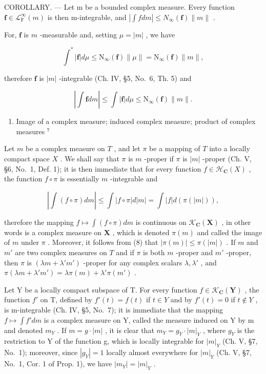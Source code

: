 COROLLARY. --- Let m be a bounded complex measure. Every function \(\mathbf{f} \in \mathcal{L}_{\mathrm{F}}^{\infty}(m)\) is then m-integrable, and \(\left|\int f dm\right| \leqslant N_{\infty}(\mathbf{f}) \|m\|\) .

For, \(\mathbf{f}\) is \(m\) -measurable and, setting \(\mu = |m|\) , we have

\[
\int^ {*} | \mathbf {f} | d \mu \leqslant \mathrm{N} _ {\infty} (\mathbf {f}) \| \mu \| = \mathrm{N} _ {\infty} (\mathbf {f}) \| m \|,
\]

therefore \(\mathbf{f}\) is \(|m|\) -integrable (Ch. IV, §5, No.~6, Th. 5) and

\[
\left| \int \mathbf {f} d m \right| \leqslant \int | \mathbf {f} | d \mu \leqslant \mathrm{N} _ {\infty} (\mathbf {f}) \| m \|.
\]

\begin{enumerate}
\def\labelenumi{\arabic{enumi}.}
\setcounter{enumi}{9}
\tightlist
\item
  Image of a complex measure; induced complex measure; product of complex measures \(^{7}\)
\end{enumerate}

Let \(m\) be a complex measure on \(T\) , and let \(\pi\) be a mapping of \(T\) into a locally compact space \(X\) . We shall say that \(\pi\) is \(m\) -proper if \(\pi\) is \(|m|\) -proper (Ch. V, §6, No.~1, Def. 1); it is then immediate that for every function \(f \in \mathcal{H}_{\mathbf{C}}(X)\) , the function \(f \circ \pi\) is essentially \(m\) -integrable and

\[
\left| \int (f \circ \pi) d m \right| \leqslant \int | f \circ \pi | d | m | = \int | f | d (\pi (| m |)),\tag{8}
\]

therefore the mapping \(f \mapsto \int (f \circ \pi) dm\) is continuous on \(\mathcal{K}_{\mathbf{C}}(\mathbf{X})\) , in other words is a complex measure on \(\mathbf{X}\) , which is denoted \(\pi(m)\) and called the image of \(m\) under \(\pi\) . Moreover, it follows from (8) that \(|\pi(m)| \leqslant \pi(|m|)\) . If \(m\) and \(m'\) are two complex measures on \(T\) and if \(\pi\) is both \(m\) -proper and \(m'\) -proper, then \(\pi\) is \((\lambda m + \lambda'm')\) -proper for any complex scalars \(\lambda, \lambda'\) , and \(\pi(\lambda m + \lambda'm') = \lambda\pi(m) + \lambda'\pi(m')\) .

Let Y be a locally compact subspace of T. For every function \(f \in \mathcal{K}_{\mathbf{C}}(\mathbf{Y})\) , the function \(f'\) on T, defined by \(f'(t) = f(t)\) if \(t \in Y\) and by \(f'(t) = 0\) if \(t \notin Y\) , is m-integrable (Ch. IV, §5, No.~7); it is immediate that the mapping \(f \mapsto \int f' dm\) is a complex measure on Y, called the measure induced on Y by m and denoted \(m_{Y}\) . If \(m = g \cdot |m|\) , it is clear that \(m_{Y} = g_{Y} \cdot |m|_{Y}\) , where \(g_{Y}\) is the restriction to Y of the function g, which is locally integrable for \(|m|_{Y}\) (Ch. V, §7, No.~1); moreover, since \(|g_{Y}| = 1\) locally almost everywhere for \(|m|_{Y}\) (Ch. V, §7, No.~1, Cor. 1 of Prop. 1), we have \(|m_{Y}| = |m|_{Y}\) .

